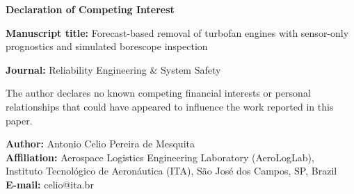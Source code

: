 \documentclass[12pt,a4paper]{article}
\begin{document}
\begin{center}
  {\large\bfseries Declaration of Competing Interest}
\end{center}

\bigskip

\noindent
\textbf{Manuscript title:} Forecast-based removal of turbofan engines with sensor-only prognostics and simulated borescope inspection

\medskip

\noindent
\textbf{Journal:} Reliability Engineering \& System Safety

\bigskip

The author declares no known competing financial interests or personal relationships
that could have appeared to influence the work reported in this paper.

\vspace{3cm}

\noindent
\textbf{Author:} Antonio Celio Pereira de Mesquita\\
\textbf{Affiliation:} Aerospace Logistics Engineering Laboratory (AeroLogLab),\\
Instituto Tecnol\'{o}gico de Aeron\'{a}utica (ITA),
S\~{a}o Jos\'{e} dos Campos, SP, Brazil\\
\textbf{E-mail:} celio@ita.br
\end{document}
